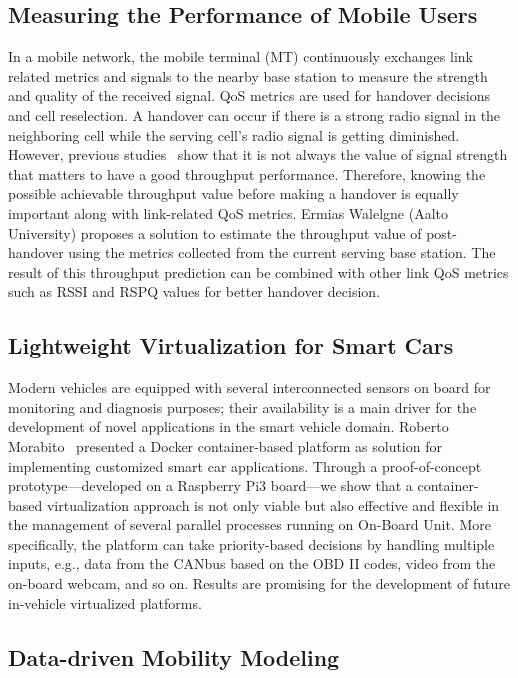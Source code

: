 \subsection{Measuring the Performance of Mobile Users}

In a mobile network, the mobile terminal (MT) continuously exchanges link
related metrics and signals to the nearby base station to measure the strength
and quality of the received signal. \ac{QoS} metrics are used for handover
decisions and cell reselection.  A handover can occur if there is a strong
radio signal in the neighboring cell while the serving cell’s radio signal is
getting diminished.  However, previous studies~\cite{ssonntag:wcnc:2013} show
that it is not always the value of signal strength that matters to have a good
throughput performance.  Therefore, knowing the possible achievable throughput
value before making a handover is equally important along with link-related
\ac{QoS} metrics. Ermias Walelgne (Aalto University) proposes a solution to
estimate the throughput value of post-handover using the metrics collected
from the current serving base station. The result of this throughput
prediction can be combined with other link QoS metrics such as RSSI and RSPQ
values for better handover decision.


\subsection{Lightweight Virtualization for Smart Cars}

Modern vehicles are equipped with several interconnected sensors on board for
monitoring and diagnosis purposes; their availability is a main driver for the
development of novel applications in the smart vehicle domain. Roberto
Morabito~\cite{rmorabito:im:2017} presented a Docker container-based platform
as solution for implementing customized smart car applications. Through a
proof-of-concept prototype—developed on a Raspberry Pi3 board—we show that a
container-based virtualization approach is not only viable but also effective
and flexible in the management of several parallel processes running on
On-Board Unit. More specifically, the platform can take priority-based
decisions by handling multiple inputs, e.g., data from the CANbus based on the
OBD II codes, video from the on-board webcam, and so on. Results are promising
for the development of future in-vehicle virtualized platforms.

\subsection{Data-driven Mobility Modeling}

